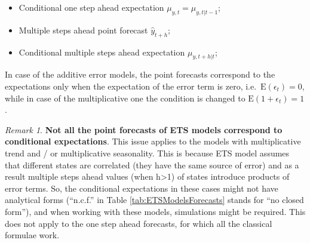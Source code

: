 \documentclass[
]{book}
\providecommand{\tightlist}{%
  \setlength{\itemsep}{0pt}\setlength{\parskip}{0pt}}
\theoremstyle{definition}
\theoremstyle{definition}
\theoremstyle{definition}
\theoremstyle{definition}
\theoremstyle{remark}
\newtheorem*{remark}{Remark}
\begin{document}
\begin{itemize}
\tightlist
\item
  Conditional one step ahead expectation \(\mu_{y,t} = \mu_{y,t|t-1}\);
\item
  Multiple steps ahead point forecast \(\hat{y}_{t+h}\);
\item
  Conditional multiple steps ahead expectation \(\mu_{y,t+h|t}\);
\end{itemize}

In case of the additive error models, the point forecasts correspond to the expectations only when the expectation of the error term is zero, i.e.~\(\text{E}(\epsilon_t)=0\), while in case of the multiplicative one the condition is changed to \(\text{E}(1+\epsilon_t)=1\).

\begin{remark}
\textbf{Not all the point forecasts of ETS models correspond to conditional expectations}. This issue applies to the models with multiplicative trend and / or multiplicative seasonality. This is because ETS model assumes that different states are correlated (they have the same source of error) and as a result multiple steps ahead values (when h\textgreater1) of states introduce products of error terms. So, the conditional expectations in these cases might not have analytical forms (``n.c.f.'' in Table \ref{tab:ETSModelsForecasts} stands for ``no closed form''), and when working with these models, simulations might be required. This does not apply to the one step ahead forecasts, for which all the classical formulae work.
\end{remark}
\end{document}
